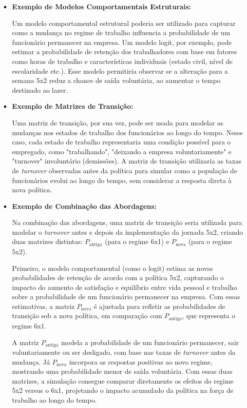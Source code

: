 \documentclass[12pt]{article}
\theoremstyle{break}
\begin{document}
\begin{itemize}
    \item \textbf{Exemplo de Modelos Comportamentais Estruturais:}

    Um modelo comportamental estrutural poderia ser utilizado para capturar como a mudança no regime de trabalho influencia a probabilidade de um funcionário permanecer na empresa. Um modelo logit, por exemplo, pode estimar a probabilidade de retenção dos trabalhadores com base em fatores como horas de trabalho e características individuais (estado civil, nível de escolaridade etc.). Esse modelo permitiria observar se a alteração para a semana 5x2 reduz a chance de saída voluntária, ao aumentar o tempo destinado ao lazer.

    \item \textbf{Exemplo de Matrizes de Transição:}

    Uma matriz de transição, por sua vez, pode ser usada para modelar as mudanças nos estados de trabalho dos funcionários ao longo do tempo. Nesse caso, cada estado de trabalho representaria uma condição possível para o empregado, como "trabalhando", "deixando a empresa voluntariamente" e "turnover" involuntário (demissões). A matriz de transição utilizaria as taxas de \textit{turnover} observadas antes da política para simular como a população de funcionários evolui ao longo do tempo, sem considerar a resposta direta à nova política.

    \item \textbf{Exemplo de Combinação das Abordagens:}

    Na combinação das abordagens, uma matriz de transição seria utilizada para modelar o \textit{turnover} antes e depois da implementação da jornada 5x2, criando duas matrizes distintas: \( P_{\text{antiga}} \) (para o regime 6x1) e \( P_{\text{nova}} \) (para o regime 5x2).

    Primeiro, o modelo comportamental (como o logit) estima as novas probabilidades de retenção de acordo com a política 5x2, capturando o impacto do aumento de satisfação e equilíbrio entre vida pessoal e trabalho sobre a probabilidade de um funcionário permanecer na empresa. Com essas estimativas, a matriz \( P_{\text{nova}} \) é ajustada para refletir as probabilidades de transição sob a nova política, em comparação com \( P_{\text{antiga}} \), que representa o regime 6x1.

    A matriz \( P_{\text{antiga}} \) modela a probabilidade de um funcionário permanecer, sair voluntariamente ou ser desligado, com base nas taxas de \textit{turnover} antes da mudança. Já \( P_{\text{nova}} \) incorpora as respostas positivas ao novo regime, mostrando uma probabilidade menor de saída voluntária. Com essas duas matrizes, a simulação consegue comparar diretamente os efeitos do regime 5x2 versus o 6x1, projetando o impacto acumulado da política na força de trabalho ao longo do tempo.
\end{itemize}
\end{document}
